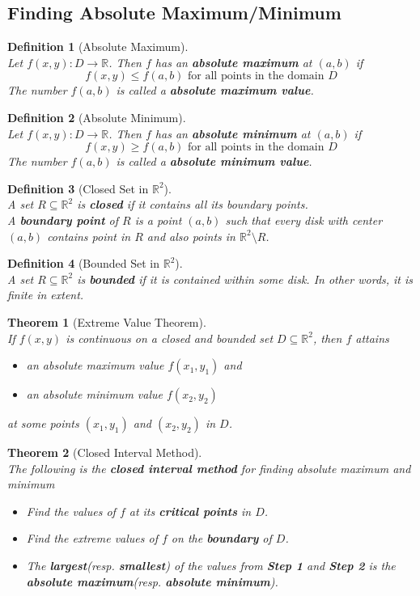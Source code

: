 \documentclass[12pt]{article}
\newtheorem{definition}{Definition}[section]
\newtheorem{theorem}{Theorem}[section]
\theoremstyle{definition}
\begin{document}
\subsection{Finding Absolute Maximum/Minimum}
\begin{definition}[Absolute Maximum]
\hfill\\\normalfont Let $f(x,y):D\to\mathbb{R}$. Then $f$ has an \textbf{absolute maximum} at $(a,b)$ if
\[
f(x,y)\leq f(a,b)\text{ for all points in the domain }D
\]
The number $f(a,b)$ is called a \textbf{absolute maximum value}.
\end{definition}
\begin{definition}[Absolute Minimum]
\hfill\\\normalfont Let $f(x,y):D\to\mathbb{R}$. Then $f$ has an \textbf{absolute minimum} at $(a,b)$ if
\[
f(x,y)\geq f(a,b)\text{ for all points in the domain }D
\]
The number $f(a,b)$ is called a \textbf{absolute minimum value}.
\end{definition}
\begin{definition}[Closed Set in $\mathbb{R}^2$]
\hfill\\\normalfont A set $R\subseteq\mathbb{R}^2$ is \textbf{closed} if it contains all its boundary points.\\
A \textbf{boundary point} of $R$ is a point $(a,b)$ such that every disk with center $(a,b)$ contains point in $R$ and also points in $\mathbb{R}^2\setminus R$.
\end{definition}
\begin{definition}[Bounded Set in $\mathbb{R}^2$]
\hfill\\\normalfont A set $R\subseteq\mathbb{R}^2$ is \textbf{bounded} if it is contained within some disk. In other words, it is finite in extent.
\end{definition}
\begin{theorem}[Extreme Value Theorem]
\hfill\\\normalfont If $f(x,y)$ is continuous on a closed and bounded set $D\subseteq \mathbb{R}^2$, then $f$ attains
\begin{itemize}
  \item an absolute maximum value $f(x_1,y_1)$ and
  \item an absolute minimum value $f(x_2,y_2)$
\end{itemize}
at some points $(x_1,y_1)$ and $(x_2,y_2)$ in $D$.
\end{theorem}
\begin{theorem}[Closed Interval Method]
\hfill\\\normalfont
The following is the \textbf{closed interval method} for finding absolute maximum and minimum
\begin{itemize}
  \item[Step 1] Find the values of $f$ at its \textbf{critical points} in $D$.
  \item[Step 2] Find the extreme values of $f$ on the \textbf{boundary} of $D$.
  \item[Step 3] The \textbf{largest}(resp. \textbf{smallest}) of the values from \textbf{Step 1} and \textbf{Step 2} is the \textbf{absolute maximum}(resp. \textbf{absolute minimum}).
\end{itemize}
\end{theorem}
\end{document}
